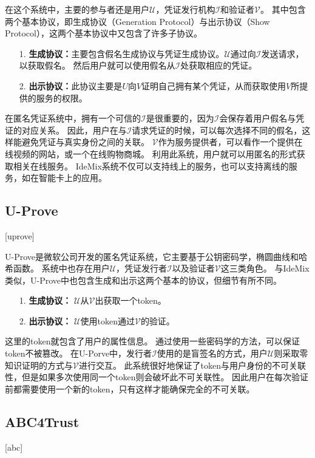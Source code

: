 在这个系统中，主要的参与者还是用户$\mathcal{U}$，凭证发行机构$\mathcal{I}$和验证者$\mathcal{V}$。
其中包含两个基本协议，即生成协议（Generation Protocol）与出示协议（Show Protocol），这两个基本协议中又包含了许多子协议。

\begin{itemize}
  \item[1.] \textbf{生成协议：}主要包含假名生成协议与凭证生成协议。$\mathcal{U}$通过向$\mathcal{I}$发送请求，以获取假名。
  然后用户就可以使用假名从$\mathcal{I}$处获取相应的凭证。
  \item[2.] \textbf{出示协议：}此协议主要是$U$向$V$证明自己拥有某个凭证，从而获取使用$V$所提供的服务的权限。
\end{itemize}

在匿名凭证系统中，拥有一个可信的$\mathcal{I}$是很重要的，因为$\mathcal{I}$会保存着用户假名与凭证的对应关系。
因此，用户在与$\mathcal{I}$请求凭证的时候，可以每次选择不同的假名，这样能避免凭证与真实身份之间的关联。
$\mathcal{V}$作为服务提供者，可以看作一个提供在线视频的网站，或一个在线购物商城。
利用此系统，用户就可以用匿名的形式获取相关在线服务。
IdeMix系统不仅可以支持线上的服务，也可以支持离线的服务，如在智能卡上的应用\cite{bichsel2009anonymous}。

\subsection{U-Prove}[uprove]

U-Prove是微软公司开发的匿名凭证系统，它主要基于公钥密码学，椭圆曲线和哈希函数。
系统中也存在用户$\mathcal{U}$，凭证发行者$\mathcal{I}$以及验证者$\mathcal{V}$这三类角色。
与IdeMix类似，U-Prove中也包含生成和出示这两个基本的协议，但细节有所不同。

\begin{itemize}
  \item[1.] \textbf{生成协议：} $\mathcal{U}$从$\mathcal{V}$出获取一个token。
  \item[2.] \textbf{出示协议：} $\mathcal{U}$使用token通过$\mathcal{V}$的验证。
\end{itemize}

这里的token就包含了用户的属性信息。
通过使用一些密码学的方法，可以保证token不被篡改。
在U-Porve中，发行者$\mathcal{I}$使用的是盲签名的方式，用户$\mathcal{U}$则采取零知识证明的方式与$\mathcal{V}$进行交互。
此系统很好地保证了token与用户身份的不可关联性，但是如果多次使用同一个token则会破坏此不可关联性。
因此用户在每次验证前都需要使用一个新的token，只有这样才能确保完全的不可关联。

\subsection{ABC4Trust}[abc]

